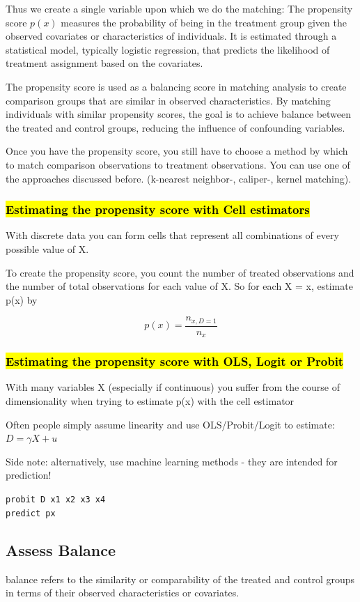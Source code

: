 \documentclass[a3paper, 8pt]{extarticle}
\begin{document}
\begin{multicols*}{5}
Thus we create a single variable upon which we do the matching: The propensity score $p(x)$ measures the probability of being in the treatment group given the observed covariates or characteristics of individuals. It is estimated through a statistical model, typically logistic regression, that predicts the likelihood of treatment assignment based on the covariates.

The propensity score is used as a balancing score in matching analysis to create comparison groups that are similar in observed characteristics. By matching individuals with similar propensity scores, the goal is to achieve balance between the treated and control groups, reducing the influence of confounding variables.

Once you have the propensity score, you still have to choose a method by which to match comparison observations to treatment observations. You can use one of the approaches discussed before. (k-nearest neighbor-, caliper-, kernel matching).

\subsubsection{\hl{Estimating the propensity score with Cell estimators}} With discrete data you can form cells that represent all combinations of every possible value of X.

To create the propensity score, you count the number of treated observations and the number of total observations for each value of X. So for each X = x, estimate p(x) by

$$p(x)=\frac{n_{x, D=1}}{n_x}$$

\subsubsection{\hl{Estimating the propensity score with OLS, Logit or Probit}}With many variables X (especially if continuous) you suffer from the course of dimensionality when trying to estimate p(x) with the cell estimator

Often people simply assume linearity and use OLS/Probit/Logit to estimate: $D = \gamma X + u$

Side note: alternatively, use machine learning methods - they are intended for prediction!

\texttt{probit D x1 x2 x3 x4\\
predict px}

\subsection{Assess Balance}
balance refers to the similarity or comparability of the treated and control groups in terms of their observed characteristics or covariates.


\end{multicols*}
\end{document}
